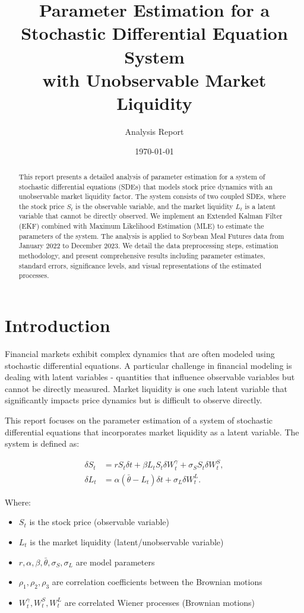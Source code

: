 \documentclass[12pt,a4paper]{article}
\title{Parameter Estimation for a Stochastic Differential Equation System\\
with Unobservable Market Liquidity}
\author{Analysis Report}
\date{\today}
\begin{document}
\maketitle

\begin{abstract}
This report presents a detailed analysis of parameter estimation for a system of stochastic differential equations (SDEs) that models stock price dynamics with an unobservable market liquidity factor. The system consists of two coupled SDEs, where the stock price $S_t$ is the observable variable, and the market liquidity $L_t$ is a latent variable that cannot be directly observed. We implement an Extended Kalman Filter (EKF) combined with Maximum Likelihood Estimation (MLE) to estimate the parameters of the system. The analysis is applied to Soybean Meal Futures data from January 2022 to December 2023. We detail the data preprocessing steps, estimation methodology, and present comprehensive results including parameter estimates, standard errors, significance levels, and visual representations of the estimated processes.
\end{abstract}

\tableofcontents

\section{Introduction}

Financial markets exhibit complex dynamics that are often modeled using stochastic differential equations. A particular challenge in financial modeling is dealing with latent variables - quantities that influence observable variables but cannot be directly measured. Market liquidity is one such latent variable that significantly impacts price dynamics but is difficult to observe directly.

This report focuses on the parameter estimation of a system of stochastic differential equations that incorporates market liquidity as a latent variable. The system is defined as:

\begin{align}
    \delta S_t &= r S_t \delta t + \beta L_t S_t \delta W_t^{\gamma}+ \sigma_{S} S_t \delta W_t^{S}, \\
    \delta L_t &= \alpha (\bar{\theta} - L_t) \delta t + \sigma_L \delta W_t^L.
\end{align}

Where:
\begin{itemize}
    \item $S_t$ is the stock price (observable variable)
    \item $L_t$ is the market liquidity (latent/unobservable variable)
    \item $r, \alpha, \beta, \bar{\theta}, \sigma_S, \sigma_L$ are model parameters
    \item $\rho_1, \rho_2, \rho_3$ are correlation coefficients between the Brownian motions
    \item $W_t^{\gamma}, W_t^{S}, W_t^{L}$ are correlated Wiener processes (Brownian motions)
\end{itemize}
\end{document}
